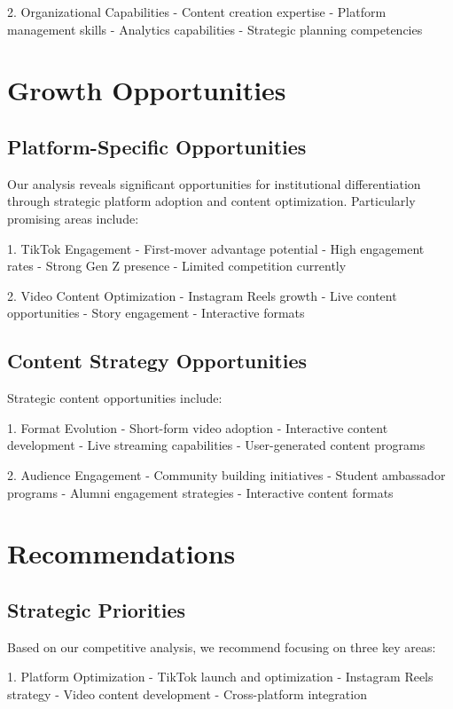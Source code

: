 \documentclass[12pt]{report}
\begin{document}
2. Organizational Capabilities
   - Content creation expertise
   - Platform management skills
   - Analytics capabilities
   - Strategic planning competencies

\chapter{Growth Opportunities}

\section{Platform-Specific Opportunities}

Our analysis reveals significant opportunities for institutional differentiation through strategic platform adoption and content optimization. Particularly promising areas include:

1. TikTok Engagement
   - First-mover advantage potential
   - High engagement rates
   - Strong Gen Z presence
   - Limited competition currently

2. Video Content Optimization
   - Instagram Reels growth
   - Live content opportunities
   - Story engagement
   - Interactive formats

\section{Content Strategy Opportunities}

Strategic content opportunities include:

1. Format Evolution
   - Short-form video adoption
   - Interactive content development
   - Live streaming capabilities
   - User-generated content programs

2. Audience Engagement
   - Community building initiatives
   - Student ambassador programs
   - Alumni engagement strategies
   - Interactive content formats

\chapter{Recommendations}

\section{Strategic Priorities}

Based on our competitive analysis, we recommend focusing on three key areas:

1. Platform Optimization
   - TikTok launch and optimization
   - Instagram Reels strategy
   - Video content development
   - Cross-platform integration
\end{document}
